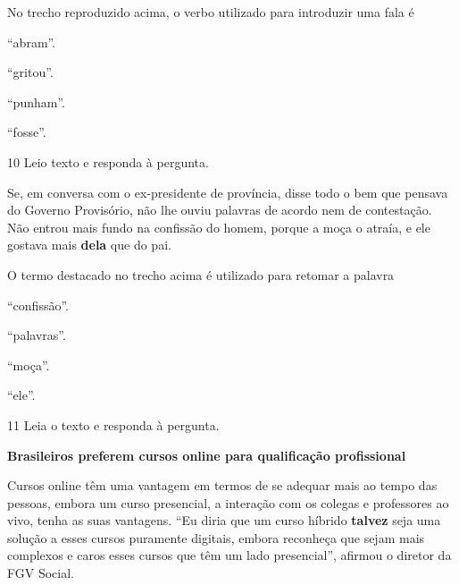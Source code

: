 \begin{myquote}
\begin{myescolha}
No trecho reproduzido acima, o verbo utilizado para introduzir uma fala
é

\begin{escolha}
  \item ``abram''.

  \item ``gritou''.

  \item ``punham''.

  \item ``fosse''.
\end{escolha}

\num{10} Leio texto e responda à pergunta.

\begin{myquote}
Se, em conversa com o ex-presidente de província, disse todo o bem que
pensava do Governo Provisório, não lhe ouviu palavras de acordo nem de
contestação. Não entrou mais fundo na confissão do homem, porque a moça
o atraía, e ele gostava mais \textbf{dela} que do pai.

\end{myquote}

O termo destacado no trecho acima é utilizado para retomar a palavra

\begin{escolha}
  \item ``confissão''.

  \item ``palavras''.

  \item ``moça''.

  \item ``ele''.
\end{escolha}

\num{11} Leia o texto e responda à pergunta.

\begin{myquote}
\textbf{Brasileiros preferem cursos online para qualificação profissional}

Cursos online têm uma vantagem em termos de se adequar mais ao tempo das
pessoas, embora um curso presencial, a interação com os colegas e
professores ao vivo, tenha as suas vantagens. ``Eu diria que um curso
híbrido \textbf{talvez} seja uma solução a esses cursos puramente digitais,
embora reconheça que sejam mais complexos e caros esses cursos que têm
um lado presencial'', afirmou o diretor da FGV Social.


\end{myquote}
\end{myescolha}
\end{myquote}
